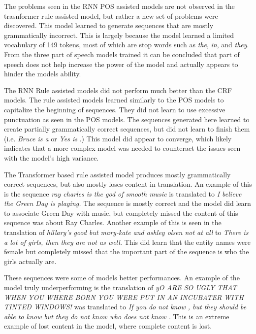 \documentclass[12pt]{article}
\begin{document}
The problems seen in the RNN POS assisted models are not observed in the trasnformer rule assisted 
model, but rather a new set of problems were discovered. This model learned to generate sequences that 
are mostly grammatically incorrect. This is largely because the model learned a limited vocabulary of 
149 tokens, most of which are stop words such as \textit{the}, \textit{in}, and \textit{they}. From the 
three part of speech models trained it can be concluded that part of speech does not help increase the 
power of the model and actually appears to hinder the models ability. \par

The RNN Rule assisted models did not perform much better than the CRF models. The rule assisted models
learned similarly to the POS models to capitalize the beginning of sequences. They did not learn 
to use excessive punctuation as seen in the POS models. The sequences generated here learned to create 
partially grammatically correct sequences, but did not learn to finish them (i.e. \textit{Bruce is a} 
or \textit{Yes is} .) This model did appear to converge, which likely indicates that a more complex
model was needed to counteract the issues seen with the model's high variance. \par

The Transformer based rule assisted model produces mostly grammatically correct sequences,
but also mostly loses content in translation. An example of this is the sequence 
\textit{ray charles is the god of smooth music} is translated to 
\textit{I believe the Green Day is playing.} The sequence is mostly correct and the model 
did learn to associate Green Day with music, but completely missed the content of this sequence was 
about Ray Charles. Another example of this is seen in the translation of \textit{hillary's good but
mary-kate and ashley olsen not at all} to \textit{There is a lot of girls, then they are not as well.}
This did learn that the entity names were female but completely missed that the important part of 
the sequence is who the girls actually are. \par 

These sequences were some of models better performances. An example of the model truly underperforming
is the translation of \textit{yO ARE SO UGLY THAT WHEN YOU WHERE BORN YOU 
WERE PUT IN AN INCUBATER WITH TINTED WINDOWS!} was translated to 
\textit{If you do not know , but they should be able to know but they do not know who does not know .}
This is an extreme example of lost content in the model, where complete content is lost. \par 
\end{document}
